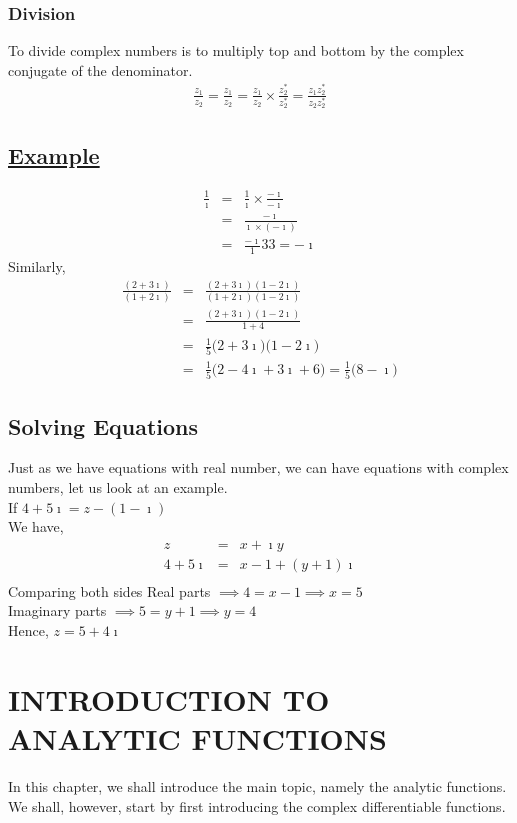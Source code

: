\documentclass[12pt]{report}
\newcommand{\ubt}[1]{\textbf{\underline{#1}}}
\newcommand{\sps}{\\[0.2cm]}
\newcommand{\imaginary}{\imath}
\newcommand{\example}[1]{\section*{\ubt{Example #1}}}
\begin{document}
	\subsection{Division}
	To divide complex numbers is to multiply top and bottom by the complex conjugate of the denominator.
	\begin{eqnarray*}
		\frac{z_1}{z_2} = \frac{z_1}{z_2}= \frac{z_1}{z_2} \times \frac{z^{*}_2}{z^{*}_2} = \frac{z_1z^{*}_2}{z_2z^{*}_2}
	\end{eqnarray*}
	\example{}
	\begin{eqnarray*}
		\frac{1}{\imaginary} &=&\frac{1}{\imaginary} \times \frac{-\imaginary}{-\imaginary}\sps
		&=&\frac{-\imaginary}{\imaginary\times(-\imaginary)}\sps
		&=& \frac{-\imaginary}{1}33
		= -\imaginary		
	\end{eqnarray*}
	Similarly,
	\begin{eqnarray*}
		\frac{(2+3\imaginary)}{(1+2\imaginary)} &=& \frac{(2+3\imaginary)(1-2\imaginary)}{(1+2\imaginary)(1-2\imaginary)}\sps
		&=&\frac{(2+3\imaginary)(1-2\imaginary)}{1+4}\sps
		&=&\frac{1}{5}\Big(2+3\imaginary\Big)\Big(1-2\imaginary\Big)\sps
		&=&\frac{1}{5}\Big(2-4\imaginary+3\imaginary+6\Big)
		= \frac{1}{5}\Big(8-\imaginary\Big)
	\end{eqnarray*}
	
	\section{Solving Equations}
	Just as we have equations with real number, we can have equations with complex numbers, let us look at an example.\\
	If $4+5\imaginary = z - (1-\imaginary)$\\
	We have, 
	\begin{eqnarray*}
		z &=& x + \imaginary y\sps
		4+5\imaginary &=& x - 1 + (y+1)\imaginary\sps
	\end{eqnarray*}
	Comparing both sides
	Real parts $\implies 4 = x -1 \implies x = 5$\sps
	Imaginary parts $\implies 5 = y+1 \implies y = 4$\\
	Hence, $z = 5+4\imaginary$
	
	\chapter{INTRODUCTION TO ANALYTIC FUNCTIONS}
	In this chapter, we shall introduce the main topic, namely the analytic functions. We shall, however, start by first introducing the complex differentiable functions.
	
\end{document}
